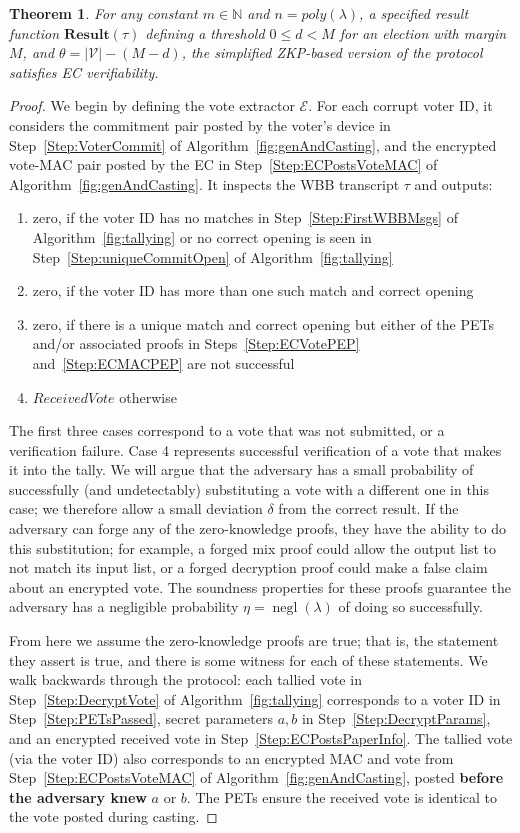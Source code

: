 \documentclass[12pt,a4paper]{article}
\DeclareMathOperator{\negl}{\text{negl}}
\newtheorem{theorem}{Theorem}
\theoremstyle{definition}
\newcommand{\ReceivedVote}{\mathit{ReceivedVote}}
\begin{document}
\begin{theorem}
    For any constant $m\in\mathbb{N}$ and $n=poly(\lambda)$, a specified result function $\mathbf{Result}(\tau)$ defining a threshold $0 \leq d < M$ for an election with margin $M$, and $\theta=|\mathcal{V}|-(M-d)$, the simplified ZKP-based version of the protocol satisfies EC verifiability.
\end{theorem}
\begin{proof}
    We begin by defining the vote extractor $\mathcal{E}$. For each corrupt voter ID, it considers the commitment pair posted by the voter's device in Step~\ref{Step:VoterCommit} of Algorithm~\ref{fig:genAndCasting}, and the encrypted vote-MAC pair posted by the EC in Step~\ref{Step:ECPostsVoteMAC} of Algorithm~\ref{fig:genAndCasting}. It inspects the WBB transcript $\tau$ and outputs:
    \begin{enumerate}
        \item zero, if the voter ID has no matches in Step~\ref{Step:FirstWBBMsgs} of Algorithm~\ref{fig:tallying} or no correct opening is seen in Step~\ref{Step:uniqueCommitOpen} of Algorithm~\ref{fig:tallying}
        \item zero, if the voter ID has more than one such match and correct opening
        \item zero, if there is a unique match and correct opening but either of the PETs and/or associated proofs in Steps~\ref{Step:ECVotePEP} and~\ref{Step:ECMACPEP} are not successful
        \item $\ReceivedVote$ otherwise
    \end{enumerate}

    The first three cases correspond to a vote that was not submitted, or a verification failure. Case 4 represents successful verification of a vote that makes it into the tally. We will argue that the adversary has a small probability of successfully (and undetectably) substituting a vote with a different one in this case; we therefore allow a small deviation $\delta$ from the correct result. If the adversary can forge any of the zero-knowledge proofs, they have the ability to do this substitution; for example, a forged mix proof could allow the output list to not match its input list, or a forged decryption proof could make a false claim about an encrypted vote. The soundness properties for these proofs guarantee the adversary has a negligible probability $\eta=\negl(\lambda)$ of doing so successfully.

    From here we assume the zero-knowledge proofs are true; that is, the statement they assert is true, and there is some witness for each of these statements. We walk backwards through the protocol: each tallied vote in Step~\ref{Step:DecryptVote} of Algorithm~\ref{fig:tallying} corresponds to a voter ID in Step~\ref{Step:PETsPassed}, secret parameters $a, b$ in Step~\ref{Step:DecryptParams}, and an encrypted received vote in Step~\ref{Step:ECPostsPaperInfo}. The tallied vote (via the voter ID) also corresponds to an encrypted MAC and vote from Step~\ref{Step:ECPostsVoteMAC} of Algorithm~\ref{fig:genAndCasting}, posted \textbf{before the adversary knew} $a$ or $b$. The PETs ensure the received vote is identical to the vote posted during casting.


\end{proof}
\end{document}
